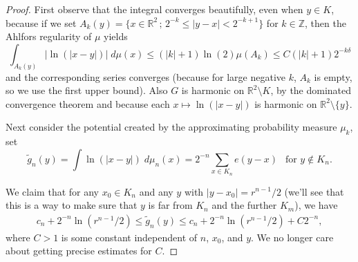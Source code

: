 \documentclass[10pt]{amsart}
\let\sm\setminus
\numberwithin{equation}{section}
\theoremstyle{plain}
\theoremstyle{definition}
\newcommand{\R}{\mathbb{R}}
\newcommand{\bZ}{\mathbb{Z}}
\begin{document}
\begin{proof}

First observe that the integral converges beautifully, even when $y \in K$, because if we set
$A_k(y) = \big\{x \in \R^2 \, ; \, 2^{-k} \leq |y-x| < 2^{-k+1} \big\}$
for $k \in \bZ$, then the Ahlfors regularity of $\mu$ yields
\begin{equation} \label{3b2}
\int_{A_k(y)} |\ln(|x-y|)| \; d\mu(x) \leq (|k|+1) \ln(2) \mu(A_k) \leq C (|k|+1) 2^{-k \delta}
\end{equation}
and the corresponding series converges (because for large negative $k$, $A_k$ is empty, so we use the first upper bound).
Also $G$ is harmonic on $\R^2 \sm K$, by the dominated convergence theorem and because each
$x \mapsto \ln(|x-y|)$ is harmonic on $\R^2 \sm \{ y \}$.

Next consider the potential created by the approximating probability measure $\mu_k$, \ie set
\begin{equation} \label{3b3}
\tilde{g}_n(y) = \int \ln(|x-y|) \; d\mu_n(x) = 2^{-n} \sum_{x \in K_n} e(y-x)
\ \ \text{ for } y\notin K_n.
\end{equation}

We claim that for any $x_0 \in K_n$ and any $y$ with $|y-x_0| = r^{n-1}/2$
(we'll see that this is a way to make sure that $y$ is far from $K_n$ and the further
$K_m$), we have
\begin{align}
c_n + 2^{-n}\ln (r^{n-1}/2) \le \tilde{g}_n(y) \le c_n + 2^{-n}\ln (r^{n-1}/2) + C 2^{-n}, \label{ga1}
\end{align}
where $C >1$ is some constant independent of $n$, $x_0$, and $y$.
We no longer care about getting precise estimates for $C$.


\end{proof}
\end{document}
